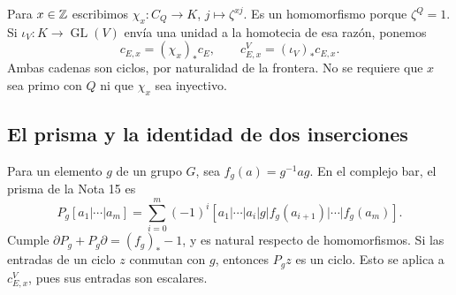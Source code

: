 Para $x\in\mathbb{Z}$ escribimos $\chi_x:C_Q\to K$, $j\mapsto\zeta^{xj}$. Es un homomorfismo porque $\zeta^Q=1$. Si $\iota_V:K\to\operatorname{GL}(V)$ envía una unidad a la homotecia de esa razón, ponemos
\begin{equation}
 c_{E,x}=(\chi_x)_*c_E,\qquad
 c_{E,x}^{V}=(\iota_V)_*c_{E,x}.
 \label{eq:ev-escalar}
\end{equation}
Ambas cadenas son ciclos, por naturalidad de la frontera. No se requiere que $x$ sea primo con $Q$ ni que $\chi_x$ sea inyectivo.

\subsection{El prisma y la identidad de dos inserciones}

Para un elemento $g$ de un grupo $G$, sea $f_g(a)=g^{-1}ag$. En el complejo bar, el prisma de la Nota 15 es
\begin{equation}
 P_g[a_1|\cdots|a_m]=\sum_{i=0}^m(-1)^i
 [a_1|\cdots|a_i|g|f_g(a_{i+1})|\cdots|f_g(a_m)].
 \label{eq:ev-prisma}
\end{equation}
Cumple $\partial P_g+P_g\partial=(f_g)_*-1$, y es natural respecto de homomorfismos. Si las entradas de un ciclo $z$ conmutan con $g$, entonces $P_gz$ es un ciclo. Esto se aplica a $c_{E,x}^V$, pues sus entradas son escalares.


